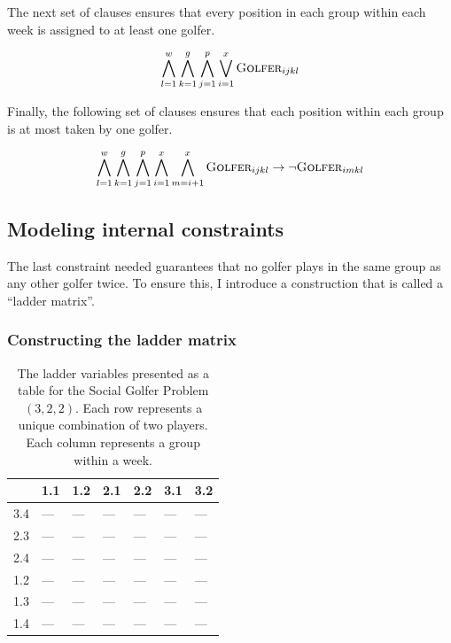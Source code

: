 \documentclass[a4paper]{scrartcl}
\begin{document}
The next set of clauses ensures that every position in each group within each week is assigned to at least one golfer.

\begin{equation}
\centering
    \bigwedge \limits_{l=1}^w 
    \bigwedge \limits_{k=1}^g 
    \bigwedge \limits_{j=1}^p
    \bigvee \limits_{i=1}^x 
    \textsc{Golfer}_{ijkl}
\end{equation}


Finally, the following set of clauses ensures that each position within each group is at most taken by one golfer.

\begin{equation}
\centering
    \bigwedge \limits_{l=1}^w 
    \bigwedge \limits_{k=1}^g 
    \bigwedge \limits_{j=1}^p
    \bigwedge \limits_{i=1}^x 
    \bigwedge \limits_{m=i+1}^x 
    \textsc{Golfer}_{ijkl} 
    \to
    \neg \textsc{Golfer}_{imkl}
\end{equation}


\subsection{Modeling internal constraints}

The last constraint needed guarantees that no golfer plays in the same group as any other golfer twice. To ensure this, I introduce a construction that is called a ``ladder matrix''.


\subsubsection{Constructing the ladder matrix}

\begin{table}[h]
\centering
\label{ladder:example}
\begin{tabular}{ l | l | l | l | l | l | l }

    & 1.1 & 1.2 & 2.1 & 2.2 & 3.1 & 3.2 \\
\hline
3.4 & --- & --- & --- & --- & --- & --- \\
2.3 & --- & --- & --- & --- & --- & --- \\
2.4 & --- & --- & --- & --- & --- & --- \\
1.2 & --- & --- & --- & --- & --- & --- \\
1.3 & --- & --- & --- & --- & --- & --- \\
1.4 & --- & --- & --- & --- & --- & --- \\

\end{tabular}
\caption{The ladder variables presented as a table for the Social Golfer Problem $(3,2,2)$. Each row represents a unique combination of two players. Each column represents a group within a week.}
\end{table}
\end{document}
